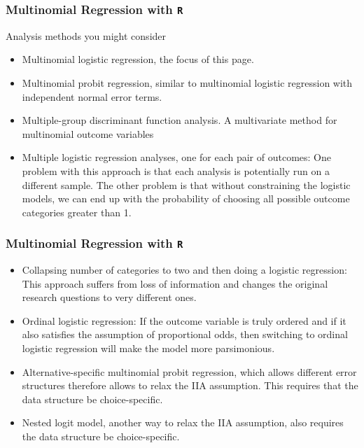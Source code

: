 \documentclass[00-GLMregslides.tex]{subfiles}
\begin{document}
\begin{frame}[fragile]

\frametitle{Multinomial Regression with \texttt{R}}
\Large
Analysis methods you might consider
\begin{itemize}
\item Multinomial logistic regression, the focus of this page. 
\item Multinomial probit regression, similar to multinomial logistic regression with independent normal error terms.
\item Multiple-group discriminant function analysis. A multivariate method for multinomial outcome variables
\item Multiple logistic regression analyses, one for each pair of outcomes: One problem with this approach is that each analysis is potentially run on a different sample. The other problem is that without constraining the logistic models, we can end up with the probability of choosing all possible outcome categories greater than 1.
\end{itemize}
\end{frame}
\begin{frame}[fragile]

\frametitle{Multinomial Regression with \texttt{R}}
\Large
\begin{itemize}
\item Collapsing number of categories to two and then doing a logistic regression: This approach suffers from loss of information and changes the original research questions to very different ones. 
\item Ordinal logistic regression: If the outcome variable is truly ordered and if it also satisfies the assumption of proportional odds, then switching to ordinal logistic regression will make the model more parsimonious.
\item Alternative-specific multinomial probit regression, which allows different error structures therefore allows to relax the IIA assumption. This requires that the data structure be choice-specific.
\item Nested logit model, another way to relax the IIA assumption, also requires the data structure be choice-specific. 
\end{itemize}
\end{frame}
\end{document}
